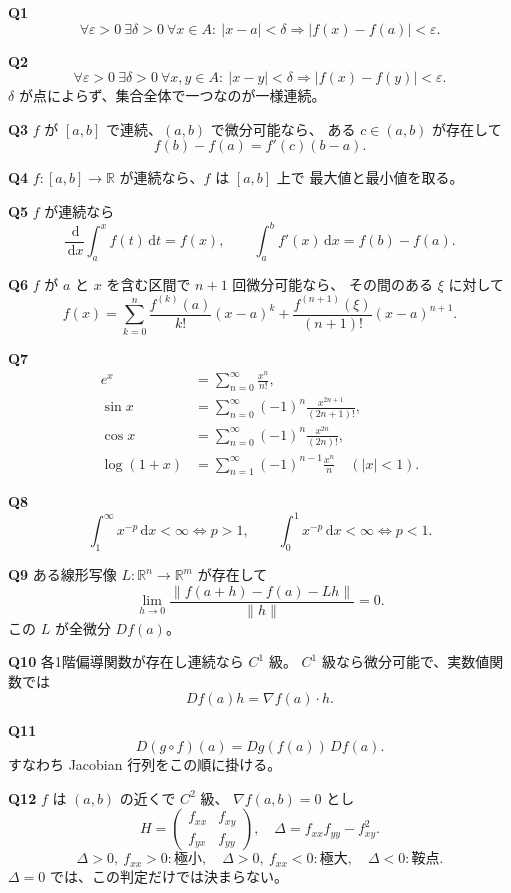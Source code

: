 \documentclass[uplatex,dvipdfmx,9pt]{jsarticle}
\newcommand{\R}{\mathbb R}
\newcommand{\dd}{\,\mathrm d}
\newcommand{\norm}[1]{\lVert#1\rVert}
\newcommand{\abs}[1]{\lvert#1\rvert}
\newcommand{\answer}[2]{%
  \par\noindent
  {\color{teal}\bfseries Q#1}\quad #2\par
  \vspace{1.5mm}
}
\newcommand{\must}[1]{\boxed{\displaystyle #1}}
\begin{document}
\begin{multicols}{2}
\answer{1}{
\[
\must{\forall\varepsilon>0\ \exists\delta>0\
\forall x\in A:\ 
\abs{x-a}<\delta\Rightarrow
\abs{f(x)-f(a)}<\varepsilon}.
\]}

\answer{2}{
\[
\forall\varepsilon>0\ \exists\delta>0\
\forall x,y\in A:\ 
\abs{x-y}<\delta\Rightarrow
\abs{f(x)-f(y)}<\varepsilon.
\]
\(\delta\) が点によらず、集合全体で一つなのが一様連続。}

\answer{3}{
\(f\) が \([a,b]\) で連続、\((a,b)\) で微分可能なら、
ある \(c\in(a,b)\) が存在して
\[
\must{f(b)-f(a)=f'(c)(b-a)}.
\]}

\answer{4}{
\(f:[a,b]\to\R\) が連続なら、\(f\) は \([a,b]\) 上で
最大値と最小値を取る。}

\answer{5}{
\(f\) が連続なら
\[
\frac{\dd}{\dd x}\int_a^xf(t)\dd t=f(x),
\qquad
\int_a^bf'(x)\dd x=f(b)-f(a).
\]}

\answer{6}{
\(f\) が \(a\) と \(x\) を含む区間で \(n+1\) 回微分可能なら、
その間のある \(\xi\) に対して
\[
\must{
f(x)=\sum_{k=0}^n\frac{f^{(k)}(a)}{k!}(x-a)^k
+\frac{f^{(n+1)}(\xi)}{(n+1)!}(x-a)^{n+1}}.
\]}

\answer{7}{
\[
\begin{aligned}
e^x&=\sum_{n=0}^\infty\frac{x^n}{n!},\\
\sin x&=\sum_{n=0}^\infty(-1)^n\frac{x^{2n+1}}{(2n+1)!},\\
\cos x&=\sum_{n=0}^\infty(-1)^n\frac{x^{2n}}{(2n)!},\\
\log(1+x)&=\sum_{n=1}^\infty(-1)^{n-1}\frac{x^n}{n}
\quad(\abs x<1).
\end{aligned}
\]}

\answer{8}{
\[
\int_1^\infty x^{-p}\dd x<\infty\iff p>1,
\qquad
\int_0^1x^{-p}\dd x<\infty\iff p<1.
\]}

\answer{9}{
ある線形写像 \(L:\R^n\to\R^m\) が存在して
\[
\must{
\lim_{h\to0}
\frac{\norm{f(a+h)-f(a)-Lh}}{\norm h}=0}.
\]
この \(L\) が全微分 \(Df(a)\)。}

\answer{10}{
各1階偏導関数が存在し連続なら \(C^1\) 級。
\(C^1\) 級なら微分可能で、実数値関数では
\[
Df(a)h=\nabla f(a)\cdot h.
\]}

\columnbreak

\answer{11}{
\[
\must{D(g\circ f)(a)=Dg(f(a))\,Df(a)}.
\]
すなわち Jacobian 行列をこの順に掛ける。}

\answer{12}{
\(f\) は \((a,b)\) の近くで \(C^2\) 級、
\(\nabla f(a,b)=0\) とし
\[
H=
\begin{pmatrix}f_{xx}&f_{xy}\\f_{yx}&f_{yy}\end{pmatrix},
\quad
\Delta=f_{xx}f_{yy}-f_{xy}^2.
\]
\[
\Delta>0,\ f_{xx}>0:\text{極小},\quad
\Delta>0,\ f_{xx}<0:\text{極大},\quad
\Delta<0:\text{鞍点}.
\]
\(\Delta=0\) では、この判定だけでは決まらない。}


\end{multicols}
\end{document}
